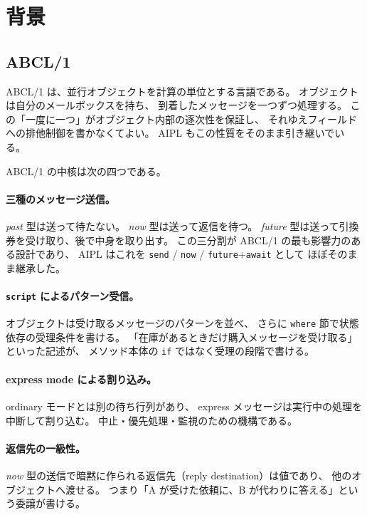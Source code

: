 \documentclass[11pt,a4paper]{ltjsarticle}
\theoremstyle{definition}
\theoremstyle{remark}
\begin{document}
\section{背景}
\label{sec:background}

\subsection{ABCL/1}
\label{sec:abcl1}

ABCL/1\cite{abcl1,abclbook} は、並行オブジェクトを計算の単位とする言語である。
オブジェクトは自分のメールボックスを持ち、
到着したメッセージを一つずつ処理する。
この「一度に一つ」がオブジェクト内部の逐次性を保証し、
それゆえフィールドへの排他制御を書かなくてよい。
AIPL もこの性質をそのまま引き継いでいる。

ABCL/1 の中核は次の四つである。

\paragraph{三種のメッセージ送信。}
\emph{past} 型は送って待たない。
\emph{now} 型は送って返信を待つ。
\emph{future} 型は送って引換券を受け取り、後で中身を取り出す。
この三分割が ABCL/1 の最も影響力のある設計であり、
AIPL はこれを \texttt{send} / \texttt{now} / \texttt{future}+\texttt{await} として
ほぼそのまま継承した。

\paragraph{\texttt{script} によるパターン受信。}
オブジェクトは受け取るメッセージのパターンを並べ、
さらに \texttt{where} 節で状態依存の受理条件を書ける。
「在庫があるときだけ購入メッセージを受け取る」といった記述が、
メソッド本体の \texttt{if} ではなく受理の段階で書ける。

\paragraph{express mode による割り込み。}
ordinary モードとは別の待ち行列があり、
express メッセージは実行中の処理を中断して割り込む。
中止・優先処理・監視のための機構である。

\paragraph{返信先の一級性。}
\emph{now} 型の送信で暗黙に作られる返信先（reply destination）は値であり、
他のオブジェクトへ渡せる。
つまり「A が受けた依頼に、B が代わりに答える」という委譲が書ける。
\end{document}
